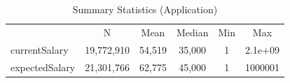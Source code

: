 \begin{table}[htbp]\centering
\def\sym#1{\ifmmode^{#1}\else\(^{#1}\)\fi}
\caption{Summary Statistics (Application)}
\begin{tabular}{l*{1}{ccccc}}
\toprule
                    &           N&        Mean&      Median&         Min&         Max\\
\label{tab:application}
currentSalary       &  19,772,910&      54,519&      35,000&           1&     2.1e+09\\
expectedSalary      &  21,301,766&      62,775&      45,000&           1&     1000001\\
\bottomrule
\end{tabular}
\end{table}
